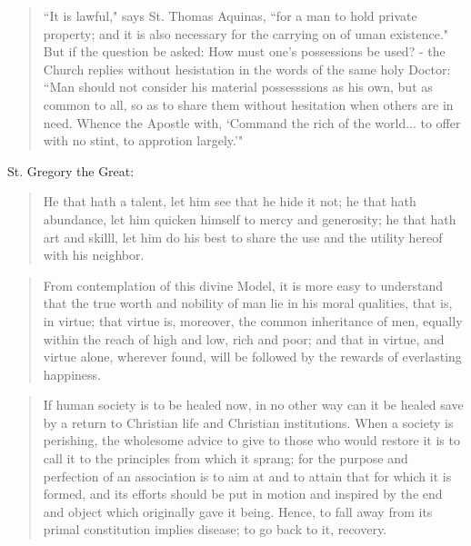 \begin{quote}
  ``It is lawful," says St. Thomas Aquinas, ``for a man to hold private property; and it is also necessary for the carrying on of uman existence." But if the question be asked: How must one's possessions be used? - the Church replies without hesistation in the words of the same holy Doctor: ``Man should not consider his material possesssions as his own, but as common to all, so as to share them without hesitation when others are in need. Whence the Apostle with, `Command the rich of the world... to offer with no stint, to approtion largely.'"
\end{quote}

St. Gregory the Great:
\begin{quote}
	He that hath a talent, let him see that he hide it not; he that hath abundance, let him quicken himself to mercy and generosity; he that hath art and skilll, let him do his best to share the use and the utility hereof with his neighbor.
\end{quote}


\begin{quote}
	From contemplation of this divine Model, it is more easy to understand that the true worth and nobility of man lie in his moral qualities, that is, in virtue; that virtue is, moreover, the common inheritance of men, equally within the reach of high and low, rich and poor; and that in virtue, and virtue alone, wherever found, will be followed by the rewards of everlasting happiness.
\end{quote}

\begin{quote}
  If human society is to be healed now, in no other way can it be healed save by a return to Christian life and Christian institutions. When a society is perishing, the wholesome advice to give to those who would restore it is to call it to the principles from which it sprang; for the purpose and perfection of an association is to aim at and to attain that for which it is formed, and its efforts should be put in motion and inspired by the end and object which originally gave it being. Hence, to fall away from its primal constitution implies disease; to go back to it, recovery.
\end{quote}

